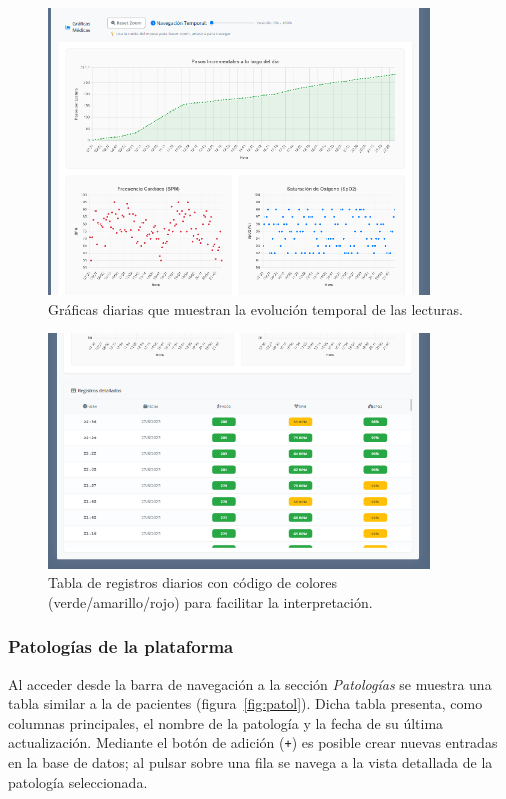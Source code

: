\documentclass[12pt, a4paper]{article}
\begin{document}
\begin{umaappendices}
	\begin{figure}[htbp]
		\centering
		\includegraphics[width=0.9\textwidth]{images/8_estudio.png}
		\caption[Ejemplo]{Gráficas diarias que muestran la evolución temporal de las lecturas.}
		\label{fig:est15}
	\end{figure}
	
	\begin{figure}[htbp]
		\centering
		\includegraphics[width=0.9\textwidth]{images/8_estudio2.png}
		\caption[Ejemplo]{Tabla de registros diarios con código de colores (verde/amarillo/rojo) para facilitar la interpretación.}
		\label{fig:est2}
	\end{figure}
	
\subsubsection{Patologías de la plataforma}
Al acceder desde la barra de navegación a la sección \textit{Patologías} se muestra una tabla similar a la de pacientes (figura~\ref{fig:patol}). Dicha tabla presenta, como columnas principales, el nombre de la patología y la fecha de su última actualización. Mediante el botón de adición (\texttt{+}) es posible crear nuevas entradas en la base de datos; al pulsar sobre una fila se navega a la vista detallada de la patología seleccionada.


\end{umaappendices}
\end{document}
